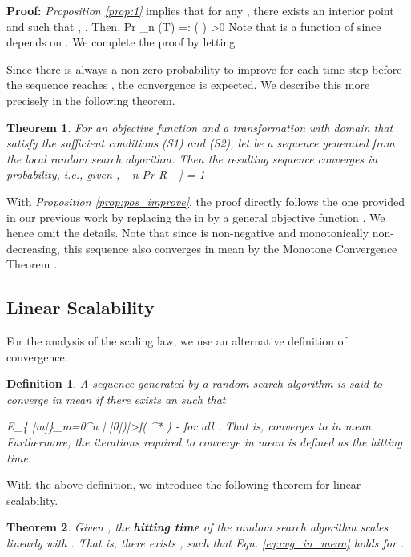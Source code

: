 \documentclass{article}
\newtheorem{thm}{Theorem}
\newtheorem{defn}{Definition}
\newcommand{\beq}{}
\newcommand{\pf}{{\bf Proof: }}
\newcommand{\Reps}{ R_{\epsilon} }
\newcommand{\pr}{ \textrm{Pr} }
\newcommand{\thetabm}{ {\boldsymbol{\theta}} }
\newcommand{\deltabm}{ {\boldsymbol{\delta}} }
\begin{document}
\pf \textit{Proposition \ref{prop:1}} implies that for any , there exists an interior point  and  such that , . Then, 
\beq\nonumber
\pr \left[ f(\thetabm+G_n(\deltabm)) - f(\thetabm) \geq \gamma(\thetabm) \right] \geq \mu_n (T) =: \eta(\thetabm) >0
\eeq
Note that  is a function of  since  depends on . We complete the proof by letting 



Since there is always a non-zero probability to improve  for each time step before the sequence reaches , the convergence is expected. We describe this more precisely in the following theorem.

\begin{thm}\label{thm:converge}
For an objective function  and a transformation  with domain  that satisfy the sufficient conditions (S1) and (S2), let  be a sequence generated from the local random search algorithm. Then the resulting sequence converges in probability, i.e., given ,
\beq\nonumber
\lim_{n \rightarrow \infty} \pr\left[ \thetabm[n] \in \Reps \right] = 1
\eeq
\end{thm}

With \textit{Proposition \ref{prop:pos_improve}}, the proof directly follows the one provided in our previous work \cite{Lin10} by replacing the  in \cite{Lin10} by a general objective function . We hence omit the details. Note that since  is non-negative and monotonically non-decreasing, this sequence also converges in mean by the Monotone Convergence Theorem \cite{Durrett95}.

\subsection{Linear Scalability}
For the analysis of the scaling law, we use an alternative definition of convergence. 
\begin{defn}
A sequence  generated by a random search algorithm is said to converge in mean if there exists an  such that 
\beq
E_{\{\deltabm[m]\}_{m=0}^{n} | \thetabm[0]}\left[f\left( \thetabm[n] \right)\right]>f\left( \thetabm^* \right) - \epsilon \label{eq:cvg_in_mean}
\eeq
for all .
That is,  converges to  in mean. 
Furthermore, the iterations required to converge in mean is defined as the hitting time.
\end{defn}


With the above definition, we introduce the following theorem for linear scalability.

\begin{thm}
Given , the \textbf{hitting time} of the random search algorithm scales linearly with . That is, there exists , such that Eqn. \eqref{eq:cvg_in_mean} holds for .
\end{thm} 
\end{document}
